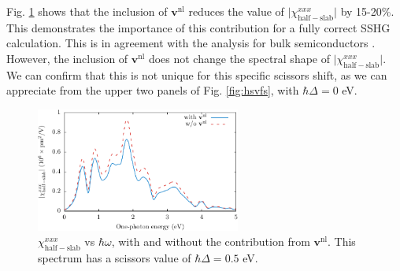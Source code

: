 Fig. \ref{fig:vnl} shows that the inclusion of $\mathbf{v}^\mathrm{nl}$ reduces
the value of $\vert\chi^{xxx}_{\mathrm{half-slab}}\vert$ by 15-20\%. This
demonstrates the importance of this contribution for a fully correct SSHG
calculation. This is in agreement with the analysis for bulk semiconductors
\cite{luppiPRB08}. However, the inclusion of $\mathbf{v}^\mathrm{nl}$ does not
change the spectral shape of $\vert\chi^{xxx}_{\mathrm{half-slab}}\vert$. We can
confirm that this is not unique for this specific scissors shift, as we can
appreciate from the upper two panels of Fig. \ref{fig:hsvfs}, with $\hbar\Delta
= 0$ eV.

\begin{figure}[b]
\centering 
\includegraphics[width=0.6\textwidth]{content/figures/fig-Si2x1-vnl}
\caption[$\chi^{xxx}_{\mathrm{half-slab}}$ with and without
$\mathbf{v}^\mathrm{nl}$]
{$\chi^{xxx}_{\mathrm{half-slab}}$ vs $\hbar\omega$, with and without
the contribution from $\mathbf{v}^\mathrm{nl}$. This spectrum has a scissors
value of $\hbar\Delta=0.5$ eV.}
\label{fig:vnl}
\end{figure}

